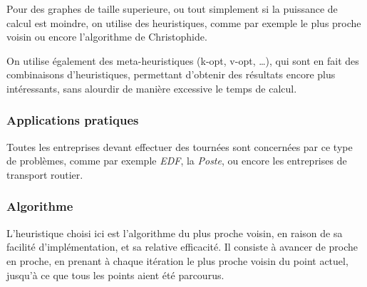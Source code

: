                 Pour des graphes de taille superieure, ou tout simplement
                si la puissance de calcul est moindre, on utilise des heuristiques,
                comme par exemple le plus proche voisin ou encore l'algorithme de Christophide.

                On utilise également des meta-heuristiques (k-opt, v-opt, \ldots),
                qui sont en fait des combinaisons
                d'heuristiques, permettant d'obtenir des résultats encore plus intéressants,
                sans alourdir de manière excessive le temps de calcul.

        \subsubsection{Applications pratiques}
            Toutes les entreprises devant effectuer des tournées sont concernées
            par ce type de problèmes, comme par exemple \emph{EDF},
            la \emph{Poste}, ou encore les entreprises de transport routier.
        \subsubsection{Algorithme}
            L'heuristique choisi ici est l'algorithme du plus proche voisin,
            en raison de sa facilité d'implémentation, et sa relative efficacité.
            Il consiste à avancer de proche en proche, en prenant à chaque itération le plus
            proche voisin du point actuel, jusqu'à ce que tous les points aient
            été parcourus.
